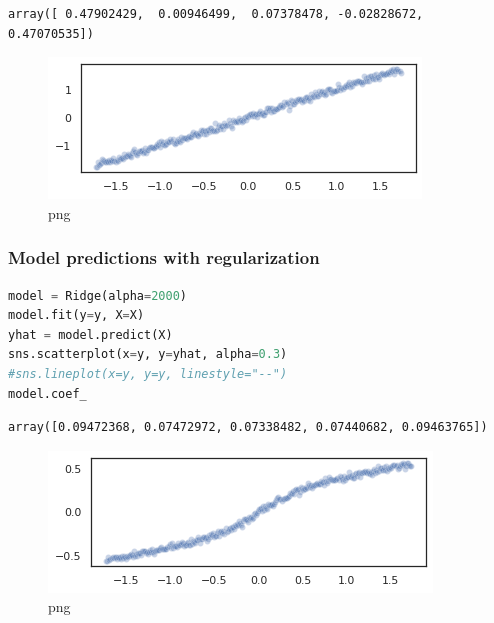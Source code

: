 \begin{lstlisting}
array([ 0.47902429,  0.00946499,  0.07378478, -0.02828672,  0.47070535])
\end{lstlisting}

\begin{figure}
\centering
\includegraphics{normality_and_linearity_violation_files/normality_and_linearity_violation_5_1.png}
\caption{png}
\end{figure}

\hypertarget{model-predictions-with-regularization}{%
\subsubsection{\texorpdfstring{Model predictions \textbf{with}
regularization}{Model predictions with regularization}}\label{model-predictions-with-regularization}}

\begin{lstlisting}[language=Python]
model = Ridge(alpha=2000)
model.fit(y=y, X=X)
yhat = model.predict(X)
sns.scatterplot(x=y, y=yhat, alpha=0.3)
#sns.lineplot(x=y, y=y, linestyle="--")
model.coef_
\end{lstlisting}

\begin{lstlisting}
array([0.09472368, 0.07472972, 0.07338482, 0.07440682, 0.09463765])
\end{lstlisting}

\begin{figure}
\centering
\includegraphics{normality_and_linearity_violation_files/normality_and_linearity_violation_7_1.png}
\caption{png}
\end{figure}

\begin{lstlisting}[language=Python]
\end{lstlisting}

